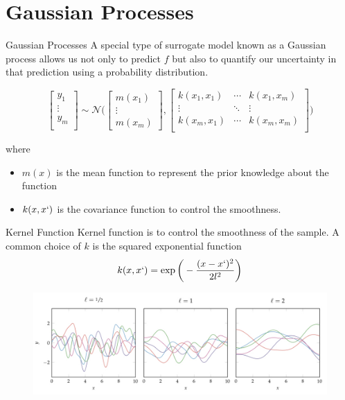 \documentclass{beamer}
\begin{document}
\section{Gaussian Processes}
\begin{frame}{Gaussian Processes}
A special type of surrogate model known as a Gaussian process allows us not only to predict $f$ but also to quantify our uncertainty in that prediction using a probability distribution.

\begin{equation*}
    \begin{bmatrix} 
    y_1\\
    \vdots\\
    y_m\\
    \end{bmatrix}
    \sim \mathcal{N}\bigg(
    \begin{bmatrix}
    m(x_1) \\
    \vdots \\
    m(x_m)
    \end{bmatrix},
    \begin{bmatrix}
    k(x_1, x_1) & \cdots & k(x_1, x_m)\\
    \vdots & \ddots & \vdots \\
    k(x_m, x_1) & \cdots & k(x_m, x_m)\\
    \end{bmatrix}
    \bigg)
\end{equation*}

where 
\begin{itemize}
    \item $m(x)$ is the mean function to represent the prior knowledge about the function
    \item $k(x, x`)$ is the covariance function to control the smoothness.
\end{itemize}

\end{frame}

\begin{frame}{Kernel Function}
Kernel function is to control the smoothness of the sample. A common choice of $k$ is the squared exponential function
\begin{equation*}
    k(x, x`) = \exp\bigg(-\frac{(x-x`)^2}{2l^2}\bigg)
\end{equation*}

\begin{figure}
\centering
\includegraphics[width=120mm]{Figs/kernel.jpeg}
\end{figure}  


\end{frame}
\end{document}

